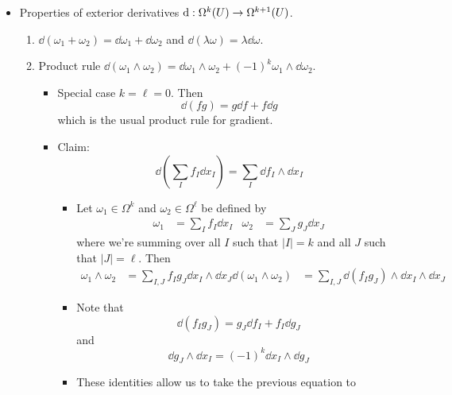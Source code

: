 \documentclass[../notes.tex]{subfiles}
\begin{document}
\begin{itemize}
    \item Properties of exterior derivatives $\dd:\ome[k]{U}\to\ome[k+1]{U}$.
    \begin{enumerate}
        \item $\dd{(\omega_1+\omega_2)}=\dd{\omega_1}+\dd{\omega_2}$ and $\dd{(\lambda\omega)}=\lambda\dd{\omega}$.
        \item Product rule $\dd{(\omega_1\wedge\omega_2)}=\dd{\omega_1}\wedge\omega_2+(-1)^k\omega_1\wedge\dd{\omega_2}$.
        \begin{itemize}
            \item Special case $k=\ell=0$. Then
            \begin{equation*}
                \dd{(fg)} = g\dd{f}+f\dd{g}
            \end{equation*}
            which is the usual product rule for gradient.
            \item Claim:
            \begin{equation*}
                \dd{\left( \sum_If_I\dd{x_I} \right)} = \sum_I\dd{f_I}\wedge\dd{x_I}
            \end{equation*}
            \begin{itemize}
                \item Let $\omega_1\in\Omega^k$ and $\omega_2\in\Omega^\ell$ be defined by
                \begin{align*}
                    \omega_1 &= \sum_If_I\dd{x_I}&
                    \omega_2 &= \sum_Jg_J\dd{x_J}
                \end{align*}
                where we're summing over all $I$ such that $|I|=k$ and all $J$ such that $|J|=\ell$. Then
                \begin{align*}
                    \omega_1\wedge\omega_2 &= \sum_{I,J}f_Ig_J\dd{x_I}\wedge\dd{x_J}
                    \dd{(\omega_1\wedge\omega_2)} &= \sum_{I,J}\dd{(f_Ig_J)}\wedge\dd{x_I}\wedge\dd{x_J}
                \end{align*}
                \item Note that
                \begin{equation*}
                    \dd{(f_Ig_J)} = g_J\dd{f_I}+f_I\dd{g_J}
                \end{equation*}
                and
                \begin{equation*}
                    \dd{g_J}\wedge\dd{x_I} = (-1)^k\dd{x_I}\wedge\dd{g_J}
                \end{equation*}
                \item These identities allow us to take the previous equation to

\end{itemize}
\end{itemize}
\end{enumerate}
\end{itemize}
\end{document}
